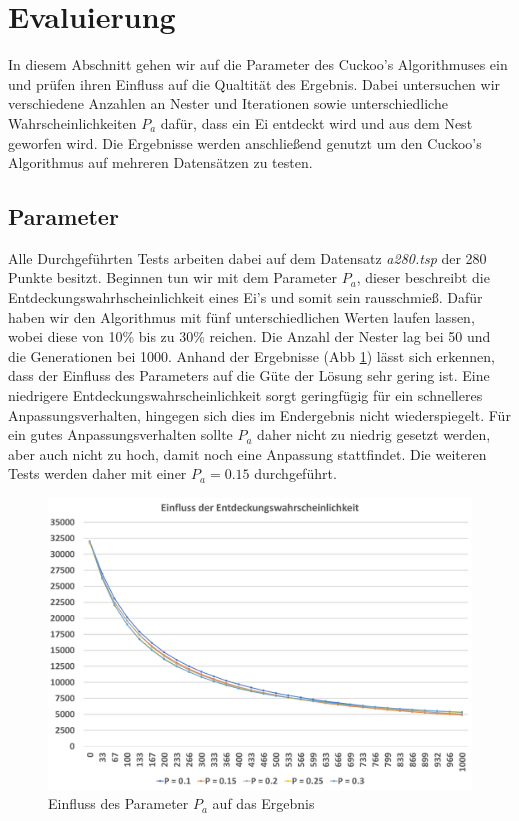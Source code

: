 \documentclass[conference]{IEEEtran}
\begin{document}
  \section{Evaluierung}
    In diesem Abschnitt gehen wir auf die Parameter des Cuckoo's Algorithmuses ein und prüfen ihren Einfluss auf die Qualtität des Ergebnis.
    Dabei untersuchen wir verschiedene Anzahlen an Nester und Iterationen sowie unterschiedliche Wahrscheinlichkeiten $P_a$ dafür, dass ein Ei entdeckt wird 
    und aus dem Nest geworfen wird. Die Ergebnisse werden anschließend genutzt um den Cuckoo's Algorithmus auf mehreren 
    Datensätzen zu testen. 

    \subsection{Parameter}
      Alle Durchgeführten Tests arbeiten dabei auf dem Datensatz \emph{a280.tsp} der 280 Punkte besitzt. 
      Beginnen tun wir mit dem Parameter $P_a$, dieser beschreibt die Entdeckungswahrhscheinlichkeit eines Ei's und somit sein rausschmieß. 
      Dafür haben wir den Algorithmus mit fünf unterschiedlichen Werten laufen lassen, wobei diese von 10\% bis zu 30\% reichen. 
      Die Anzahl der Nester lag bei 50 und die Generationen bei 1000. 
      Anhand der Ergebnisse (Abb \ref{fig:pa}) lässt sich erkennen, dass der Einfluss des Parameters auf die Güte der Lösung sehr gering ist. Eine 
      niedrigere Entdeckungswahrscheinlichkeit sorgt geringfügig für ein schnelleres Anpassungsverhalten, hingegen sich dies im Endergebnis nicht wiederspiegelt. 
      Für ein gutes Anpassungsverhalten sollte $P_a$ daher nicht zu niedrig gesetzt werden, aber auch nicht zu hoch, damit noch eine Anpassung stattfindet. 
      Die weiteren Tests werden daher mit einer $P_a = 0.15$ durchgeführt. 
      \begin{figure}[H]
        \centering
        \includegraphics[width=0.8\linewidth]{Entdeckungswahrscheinlichkeit.png}
        \caption{Einfluss des Parameter $P_a$ auf das Ergebnis}
        \label{fig:pa}
      \end{figure}
\end{document}
